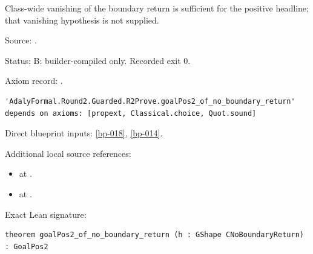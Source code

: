 \begin{theorem}[bp-022]
\label{bp-022}
\leanok
Class-wide vanishing of the boundary return is sufficient for the positive headline; that vanishing hypothesis is not supplied.

\par Source: \texttt{}.
\par Status: B: builder-compiled only. Recorded exit 0.
\par Axiom record: \texttt{}.
\begin{verbatim}
'AdalyFormal.Round2.Guarded.R2Prove.goalPos2_of_no_boundary_return' depends on axioms: [propext, Classical.choice, Quot.sound]
\end{verbatim}
\par Direct blueprint inputs: \ref{bp-018}, \ref{bp-014}.
\par Additional local source references:
\begin{itemize}
\item \texttt{} at \texttt{}.
\item \texttt{} at \texttt{}.
\end{itemize}
\par Exact Lean signature:
\begin{verbatim}
theorem goalPos2_of_no_boundary_return (h : GShape CNoBoundaryReturn) : GoalPos2
\end{verbatim}
\end{theorem}

